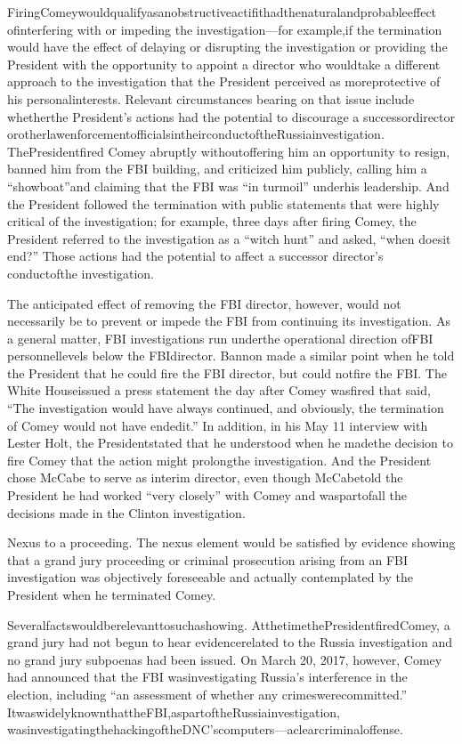 {FiringComeywouldqualifyasanobstructiveactifithadthenaturalandprobableeffect ofinterfering with or impeding the investigation—for example,if the termination would have the effect of delaying or disrupting the investigation or providing the President with the opportunity to appoint a director who wouldtake a different approach to the investigation that the President perceived as moreprotective of his personalinterests. Relevant circumstances bearing on that issue include whetherthe President’s actions had the potential to discourage a successordirector orotherlawenforcementofficialsintheirconductoftheRussiainvestigation. ThePresidentfired Comey abruptly withoutoffering him an opportunity to resign, banned him from the FBI building, and criticized him publicly, calling him a “showboat”and claiming that the FBI was “in turmoil” underhis leadership. And the President followed the termination with public statements that were highly critical of the investigation; for example, three days after firing Comey, the President referred to the investigation as a “witch hunt” and asked, “when doesit end?” Those actions had the potential to affect a successor director’s conductofthe investigation.

The anticipated effect of removing the FBI director, however, would not necessarily be to prevent or impede the FBI from continuing its investigation. As a general matter, FBI investigations run underthe operational direction ofFBI personnellevels below the FBIdirector. Bannon made a similar point when he told the President that he could fire the FBI director, but could notfire the FBI. The White Houseissued a press statement the day after Comey wasfired that said, “The investigation would have always continued, and obviously, the termination of Comey would not have endedit.” In addition, in his May 11 interview with Lester Holt, the Presidentstated that he understood when he madethe decision to fire Comey that the action might prolongthe investigation. And the President chose McCabe to serve as interim director, even though McCabetold the President he had worked “very closely” with Comey and waspartofall the decisions made in the Clinton investigation.

Nexus to a proceeding. The nexus element would be satisfied by evidence showing that a grand jury proceeding or criminal prosecution arising from an FBI investigation was objectively foreseeable and actually contemplated by the President when he terminated Comey.

Severalfactswouldberelevanttosuchashowing. AtthetimethePresidentfiredComey, a grand jury had not begun to hear evidencerelated to the Russia investigation and no grand jury subpoenas had been issued. On March 20, 2017, however, Comey had announced that the FBI wasinvestigating Russia’s interference in the election, including “an assessment of whether any crimeswerecommitted.” ItwaswidelyknownthattheFBI,aspartoftheRussiainvestigation, wasinvestigatingthehackingoftheDNC’scomputers—aclearcriminaloffense.

}
